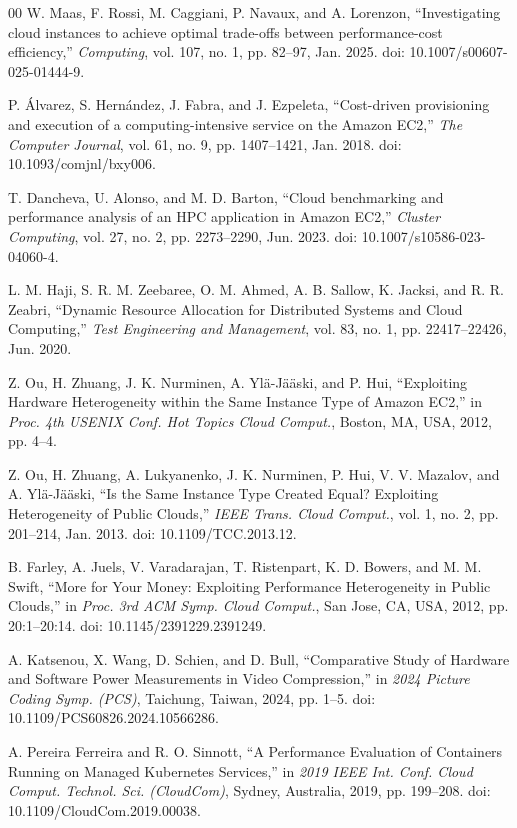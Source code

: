 \documentclass[conference]{IEEEtran}
\begin{document}
	\begin{thebibliography}{00}
		 W. Maas, F. Rossi, M. Caggiani, P. Navaux, and A. Lorenzon, ``Investigating cloud instances to achieve optimal trade-offs between performance-cost efficiency,'' \emph{Computing}, vol. 107, no. 1, pp. 82--97, Jan. 2025. doi: 10.1007/s00607-025-01444-9.
		
		 P. Álvarez, S. Hernández, J. Fabra, and J. Ezpeleta, ``Cost-driven provisioning and execution of a computing-intensive service on the Amazon EC2,'' \emph{The Computer Journal}, vol. 61, no. 9, pp. 1407--1421, Jan. 2018. doi: 10.1093/comjnl/bxy006.
		
		 T. Dancheva, U. Alonso, and M. D. Barton, ``Cloud benchmarking and performance analysis of an HPC application in Amazon EC2,'' \emph{Cluster Computing}, vol. 27, no. 2, pp. 2273--2290, Jun. 2023. doi: 10.1007/s10586-023-04060-4.
		
		 L. M. Haji, S. R. M. Zeebaree, O. M. Ahmed, A. B. Sallow, K. Jacksi, and R. R. Zeabri, ``Dynamic Resource Allocation for Distributed Systems and Cloud Computing,'' \emph{Test Engineering and Management}, vol. 83, no. 1, pp. 22417--22426, Jun. 2020.
		
		 Z. Ou, H. Zhuang, J. K. Nurminen, A. Ylä-Jääski, and P. Hui, ``Exploiting Hardware Heterogeneity within the Same Instance Type of Amazon EC2,'' in \emph{Proc. 4th USENIX Conf. Hot Topics Cloud Comput.}, Boston, MA, USA, 2012, pp. 4--4.
		
		 Z. Ou, H. Zhuang, A. Lukyanenko, J. K. Nurminen, P. Hui, V. V. Mazalov, and A. Ylä-Jääski, ``Is the Same Instance Type Created Equal? Exploiting Heterogeneity of Public Clouds,'' \emph{IEEE Trans. Cloud Comput.}, vol. 1, no. 2, pp. 201--214, Jan. 2013. doi: 10.1109/TCC.2013.12.
		
		 B. Farley, A. Juels, V. Varadarajan, T. Ristenpart, K. D. Bowers, and M. M. Swift, ``More for Your Money: Exploiting Performance Heterogeneity in Public Clouds,'' in \emph{Proc. 3rd ACM Symp. Cloud Comput.}, San Jose, CA, USA, 2012, pp. 20:1--20:14. doi: 10.1145/2391229.2391249.
		
		 A. Katsenou, X. Wang, D. Schien, and D. Bull, ``Comparative Study of Hardware and Software Power Measurements in Video Compression,'' in \emph{2024 Picture Coding Symp. (PCS)}, Taichung, Taiwan, 2024, pp. 1--5. doi: 10.1109/PCS60826.2024.10566286.
		
		 A. Pereira Ferreira and R. O. Sinnott, ``A Performance Evaluation of Containers Running on Managed Kubernetes Services,'' in \emph{2019 IEEE Int. Conf. Cloud Comput. Technol. Sci. (CloudCom)}, Sydney, Australia, 2019, pp. 199--208. doi: 10.1109/CloudCom.2019.00038.
		

\end{thebibliography}
\end{document}
